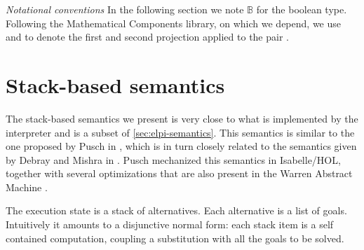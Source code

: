 

\vspace{10pt}
\textit{Notational conventions}
In the following section we note $\mathbb{B}$ for the boolean type. 
Following the Mathematical Components library, on which we depend,
we use  and  to denote the first and second projection
applied to the pair .

\section{Stack-based semantics}
\label{stack-sem}

The stack-based semantics we present is very close to what is
implemented by the \elpi interpreter and is a subset of \cref{sec:elpi-semantics}.
This semantics is 
similar to the one proposed by Pusch in
\cite{pusch1996}, which is in turn closely related to the
semantics given by Debray and Mishra in
\cite[Section~4.3]{debray1988}. Pusch mechanized this
semantics in Isabelle/HOL, together with several optimizations that are
also present in the Warren Abstract Machine
\cite{warren1983,ait1991-wam}.

The execution state is a stack of alternatives.
Each alternative is a list of goals. Intuitively it amounts to
a disjunctive normal form: each stack item is a self contained
computation, coupling a substitution with all the goals to be
solved.

